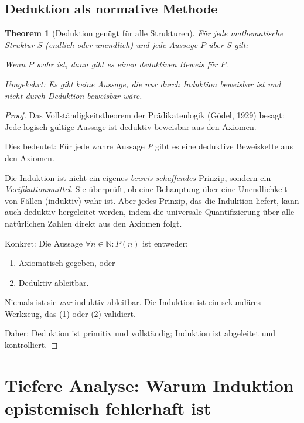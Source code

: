 \documentclass[12pt, a4paper]{article}
\newtheorem{theorem}{Theorem}[section]
\theoremstyle{definition}
\theoremstyle{remark}
\newcommand{\N}{\mathbb{N}}
\begin{document}
\subsection{Deduktion als normative Methode}
\label{subsec:deduktion_normativ}

\begin{theorem}[Deduktion genügt für alle Strukturen]
\label{thm:deduktion_genuegtfueralle}
Für jede mathematische Struktur $S$ (endlich oder unendlich) und jede Aussage $P$ über $S$ gilt:

Wenn $P$ wahr ist, dann gibt es einen deduktiven Beweis für $P$.

Umgekehrt: Es gibt keine Aussage, die nur durch Induktion beweisbar ist und nicht durch Deduktion beweisbar wäre.
\end{theorem}

\begin{proof}
Das Vollständigkeitstheorem der Prädikatenlogik (Gödel, 1929) besagt: Jede logisch gültige Aussage ist deduktiv beweisbar aus den Axiomen.

Dies bedeutet: Für jede wahre Aussage $P$ gibt es eine deduktive Beweiskette aus den Axiomen.

Die Induktion ist nicht ein eigenes \emph{beweis-schaffendes} Prinzip, sondern ein \emph{Verifikationsmittel}. Sie überprüft, ob eine Behauptung über eine Unendlichkeit von Fällen (induktiv) wahr ist. Aber jedes Prinzip, das die Induktion liefert, kann auch deduktiv hergeleitet werden, indem die universale Quantifizierung über alle natürlichen Zahlen direkt aus den Axiomen folgt.

Konkret: Die Aussage $\forall n \in \N: P(n)$ ist entweder:
\begin{enumerate}[label=(\alph*)]
  \item Axiomatisch gegeben, oder
  \item Deduktiv ableitbar.
\end{enumerate}

Niemals ist sie \emph{nur} induktiv ableitbar. Die Induktion ist ein sekundäres Werkzeug, das (1) oder (2) validiert.

Daher: Deduktion ist primitiv und vollständig; Induktion ist abgeleitet und kontrolliert.
\end{proof}

\section{Tiefere Analyse: Warum Induktion epistemisch fehlerhaft ist}
\label{sec:tiefere_induktion}
\end{document}
